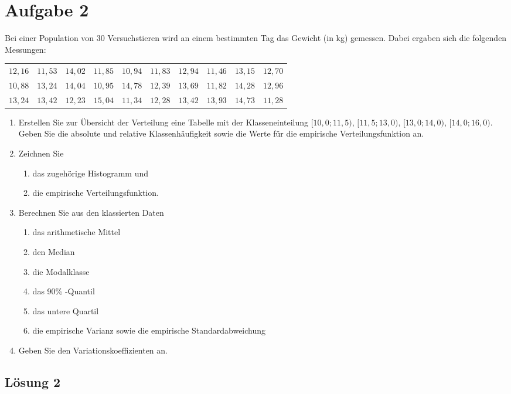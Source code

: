 \documentclass[main.tex]{subfiles}
\begin{document}
\section{Aufgabe 2}
Bei einer Population von $30$ Versuchstieren wird an einem bestimmten Tag das Gewicht (in kg) gemessen. Dabei ergaben sich die folgenden Messungen:
\begin{center}
\begin{tabular}{cccccccccc}
$12,16$ & $11,53$ & $14,02$ & $11,85$ & $10,94$ & $11,83$ & $12,94$ & $11,46$ & $13,15$ & $12,70$ \\
$10,88$ & $13,24$ & $14,04$ & $10,95$ & $14,78$ & $12,39$ & $13,69$ & $11,82$ & $14,28$ & $12,96$ \\
$13,24$ & $13,42$ & $12,23$ & $15,04$ & $11,34$ & $12,28$ & $13,42$ & $13,93$ & $14,73$ & $11,28$
\end{tabular}
\end{center}
\begin{enumerate}
\item Erstellen Sie zur Übersicht der Verteilung eine Tabelle mit der Klasseneinteilung $[10,0;11,5)$, $[11,5;13,0)$, $[13,0;14,0)$, $[14,0;16,0)$. Geben Sie die absolute und relative Klassenhäufigkeit sowie die Werte für die empirische Verteilungsfunktion an. 
\item Zeichnen Sie 
\begin{enumerate}
\item das zugehörige Histogramm und 
\item die empirische Verteilungsfunktion.
\end{enumerate}
\item Berechnen Sie aus den klassierten Daten
\begin{enumerate}
\item das arithmetische Mittel
\item den Median  
\item die Modalklasse
\item das 90\% -Quantil
\item das untere Quartil 
\item die empirische Varianz sowie die empirische Standardabweichung
\end{enumerate}
\item Geben Sie den Variationskoeffizienten an.
\end{enumerate}

\subsection{Lösung 2}
\end{document}
